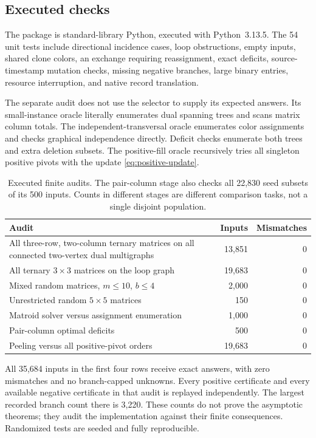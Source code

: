 \documentclass[11pt,letterpaper]{article}
\theoremstyle{definition}
\theoremstyle{remark}
\begin{document}
\subsection{Executed checks}
The package is standard-library Python, executed with Python~3.13.5. The 54 unit
tests include directional incidence cases, loop obstructions, empty inputs,
shared clone colors, an exchange requiring reassignment, exact deficits,
source-timestamp mutation checks, missing negative branches, large binary
entries, resource interruption, and native record translation.

The separate audit does not use the selector to supply its expected answers.
Its small-instance oracle literally enumerates dual spanning trees and scans
matrix column totals. The independent-transversal oracle enumerates color
assignments and checks graphical independence directly. Deficit checks enumerate
both trees and extra deletion subsets. The positive-fill oracle recursively tries
all singleton positive pivots with the update \eqref{eq:positive-update}.

\begin{table}[htbp]\centering\small
\begin{tabular}{p{3.7in}rr}\toprule
Audit & Inputs & Mismatches\\\midrule
All three-row, two-column ternary matrices on all connected two-vertex dual multigraphs & 13,851 & 0\\
All ternary $3\times3$ matrices on the loop graph & 19,683 & 0\\
Mixed random matrices, $m\le10$, $b\le4$ & 2,000 & 0\\
Unrestricted random $5\times5$ matrices & 150 & 0\\
Matroid solver versus assignment enumeration & 1,000 & 0\\
Pair-column optimal deficits & 500 & 0\\
Peeling versus all positive-pivot orders & 19,683 & 0\\
\bottomrule\end{tabular}
\caption{Executed finite audits. The pair-column stage also checks all 22,830 seed subsets of its 500 inputs. Counts in different stages are different comparison tasks, not a single disjoint population.}
\end{table}

All 35,684 inputs in the first four rows receive exact answers, with zero
mismatches and no branch-capped unknowns. Every positive certificate and every
available negative certificate in that audit is replayed independently. The
largest recorded branch count there is 3,220. These counts do not prove the
asymptotic theorems; they audit the implementation against their finite
consequences. Randomized tests are seeded and fully reproducible.
\end{document}

